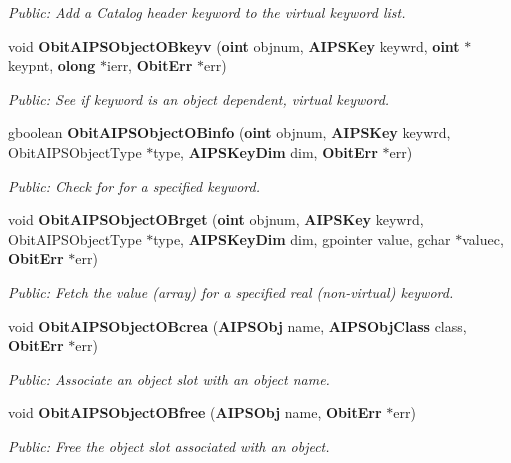 \begin{CompactItemize}
\begin{CompactList}\small\item\em Public: Add a Catalog header keyword to the virtual keyword list. \item\end{CompactList}\item 
void {\bf Obit\-AIPSObject\-OBkeyv} ({\bf oint} objnum, {\bf AIPSKey} keywrd, {\bf oint} $\ast$keypnt, {\bf olong} $\ast$ierr, {\bf Obit\-Err} $\ast$err)
\begin{CompactList}\small\item\em Public: See if keyword is an object dependent, virtual keyword. \item\end{CompactList}\item 
gboolean {\bf Obit\-AIPSObject\-OBinfo} ({\bf oint} objnum, {\bf AIPSKey} keywrd, Obit\-AIPSObject\-Type $\ast$type, {\bf AIPSKey\-Dim} dim, {\bf Obit\-Err} $\ast$err)
\begin{CompactList}\small\item\em Public: Check for for a specified keyword. \item\end{CompactList}\item 
void {\bf Obit\-AIPSObject\-OBrget} ({\bf oint} objnum, {\bf AIPSKey} keywrd, Obit\-AIPSObject\-Type $\ast$type, {\bf AIPSKey\-Dim} dim, gpointer value, gchar $\ast$valuec, {\bf Obit\-Err} $\ast$err)
\begin{CompactList}\small\item\em Public: Fetch the value (array) for a specified real (non-virtual) keyword. \item\end{CompactList}\item 
void {\bf Obit\-AIPSObject\-OBcrea} ({\bf AIPSObj} name, {\bf AIPSObj\-Class} class, {\bf Obit\-Err} $\ast$err)
\begin{CompactList}\small\item\em Public: Associate an object slot with an object name. \item\end{CompactList}\item 
void {\bf Obit\-AIPSObject\-OBfree} ({\bf AIPSObj} name, {\bf Obit\-Err} $\ast$err)
\begin{CompactList}\small\item\em Public: Free the object slot associated with an object. \item\end{CompactList}\item 

\end{CompactItemize}
